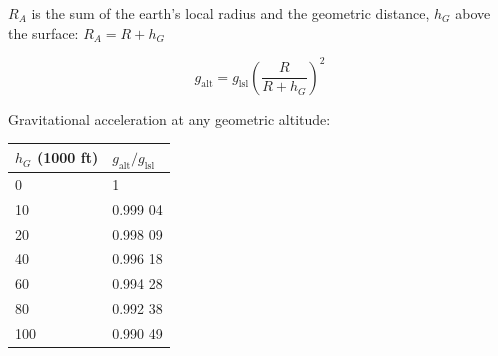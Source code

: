 \documentclass[
]{book}
\begin{document}
\(R_A\) is the sum of the earth's local radius and the geometric distance, \(h_G\) above the surface: \(R_A = R + h_G\)

\[
g_{\mathrm{alt}} = g_{\mathrm{lsl}}\left( \frac{R}{R + h_G} \right)^2
\]

Gravitational acceleration at any geometric altitude:

\begin{longtable}[]{@{}ll@{}}
\toprule
\begin{minipage}[b]{0.16\columnwidth}\raggedright
\(h_G\)
(1000 ft)\strut
\end{minipage} & \begin{minipage}[b]{0.26\columnwidth}\raggedright
\(g_{\mathrm{alt}}/g_{\mathrm{lsl}}\)\strut
\end{minipage}\tabularnewline
\midrule
\endhead
\begin{minipage}[t]{0.16\columnwidth}\raggedright
0\strut
\end{minipage} & \begin{minipage}[t]{0.26\columnwidth}\raggedright
1\strut
\end{minipage}\tabularnewline
\begin{minipage}[t]{0.16\columnwidth}\raggedright
10\strut
\end{minipage} & \begin{minipage}[t]{0.26\columnwidth}\raggedright
0.999 04\strut
\end{minipage}\tabularnewline
\begin{minipage}[t]{0.16\columnwidth}\raggedright
20\strut
\end{minipage} & \begin{minipage}[t]{0.26\columnwidth}\raggedright
0.998 09\strut
\end{minipage}\tabularnewline
\begin{minipage}[t]{0.16\columnwidth}\raggedright
40\strut
\end{minipage} & \begin{minipage}[t]{0.26\columnwidth}\raggedright
0.996 18\strut
\end{minipage}\tabularnewline
\begin{minipage}[t]{0.16\columnwidth}\raggedright
60\strut
\end{minipage} & \begin{minipage}[t]{0.26\columnwidth}\raggedright
0.994 28\strut
\end{minipage}\tabularnewline
\begin{minipage}[t]{0.16\columnwidth}\raggedright
80\strut
\end{minipage} & \begin{minipage}[t]{0.26\columnwidth}\raggedright
0.992 38\strut
\end{minipage}\tabularnewline
\begin{minipage}[t]{0.16\columnwidth}\raggedright
100\strut
\end{minipage} & \begin{minipage}[t]{0.26\columnwidth}\raggedright
0.990 49\strut
\end{minipage}\tabularnewline
\bottomrule
\end{longtable}
\end{document}
